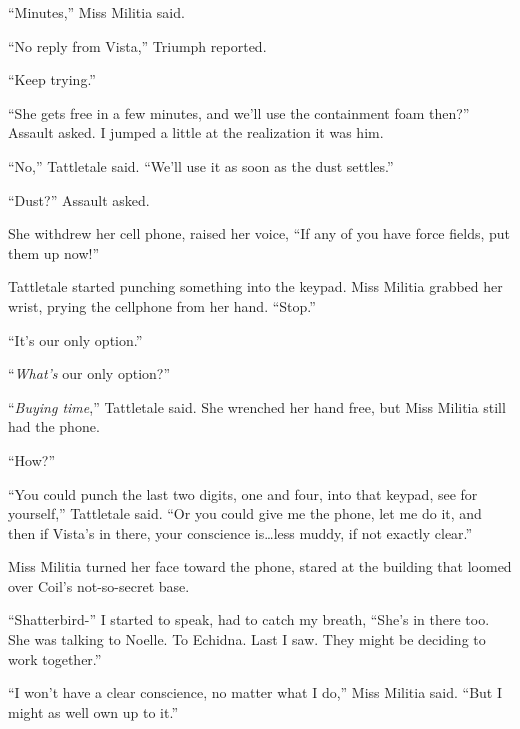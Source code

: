 ``Minutes,'' Miss Militia said.



``No reply from Vista,'' Triumph reported.



``Keep trying.''



``She gets free in a few minutes, and we'll use the containment foam then?'' Assault asked.  I jumped a little at the realization it was him.



``No,'' Tattletale said.  ``We'll use it as soon as the dust settles.''



``Dust?''  Assault asked.



She withdrew her cell phone, raised her voice, ``If any of you have force fields, put them up now!''



Tattletale started punching something into the keypad.  Miss Militia grabbed her wrist, prying the cellphone from her hand.  ``Stop.''



``It's our only option.''



``\emph{What's} our only option?''



``\emph{Buying time},'' Tattletale said.  She wrenched her hand free, but Miss Militia still had the phone.



``How?''



``You could punch the last two digits, one and four, into that keypad, see for yourself,'' Tattletale said.  ``Or you could give me the phone, let me do it, and then if Vista's in there, your conscience is\ldots less muddy, if not exactly clear.''



Miss Militia turned her face toward the phone, stared at the building that loomed over Coil's not-so-secret base.



``Shatterbird-'' I started to speak, had to catch my breath, ``She's in there too.  She was talking to Noelle.  To Echidna.  Last I saw.  They might be deciding to work together.''



``I won't have a clear conscience, no matter what I do,'' Miss Militia said.  ``But I might as well own up to it.''



